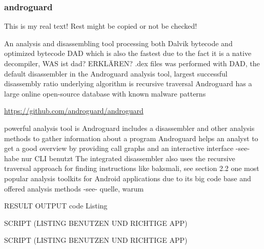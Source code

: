 \subsubsection{androguard} \label{subsection:forensics-tools-java-androguard}
This is my real text! Rest might be copied or not be checked!

%
An analysis and disassembling tool processing both Dalvik bytecode and optimized bytecode\newline
DAD which is also the fastest due to the fact it is a native decompiler, WAS ist dad? ERKLÄREN? .dex files was performed with DAD, the default disassembler
in the Androguard analysis tool, largest successful disassembly
ratio\newline
underlying algorithm is recursive traversal\newline
Androguard has a large online open-source database with known malware patterns\newline
\cite{kovachevaMaster}
%




\url{https://github.com/androguard/androguard}

powerful analysis tool is Androguard\newline
includes a disassembler and other analysis methods to gather information about a program\newline
Androguard helps an analyst to get a good overview by providing call graphs and an interactive interface -see- habe nur CLI benutzt\newline
The integrated disassembler also uses the recursive traversal approach for finding instructions like baksmali, see section 2.2\newline
one most popular analysis toolkits for Android applications due to its big code base and offered analysis methods -see- quelle, warum\newline


RESULT OUTPUT
code Listing

SCRIPT (LISTING BENUTZEN UND RICHTIGE APP)

SCRIPT (LISTING BENUTZEN UND RICHTIGE APP)


